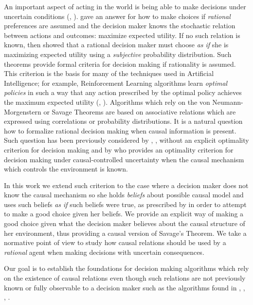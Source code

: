 \documentclass{article}
\theoremstyle{plain}
\begin{document}
An important aspect of acting in the world is being able to make decisions under uncertain conditions (\cite{danks2014unifying}, \cite{lake2017building}). \cite{von1944theory} gave an answer for how to make choices if \textit{rational} preferences are assumed and the decision maker knows the stochastic relation between actions and outcomes: maximize expected utility. If no such relation is known, then \cite{savage1954the} showed that a rational decision maker must choose \textit{as if} she is maximizing expected utility using a \textit{subjective} probability distribution. Such theorems provide formal criteria for decision making if rationality is assumed. This criterion is the basis for many of the techniques used in Artificial Intelligence; for example, Reinforcement Learning algorithms learn \textit{optimal policies} in such a way that any action prescribed by the optimal policy achieves the maximum expected utility (\cite{sutton1998reinforcement}, \cite{Puterman:1994:MDP:528623}). Algorithms which rely on the von Neumann-Morgenstern or Savage Theorems are based on associative relations which are expressed using correlations or probability distributions. It is a natural question how to formalize rational decision making when causal information is present. Such question has been previously considered by \cite{nozick1969newcomb}, \cite{lewis1981causal}, \cite{joyce1999foundations} without an explicit optimality criterion for decision making and by \cite{pearl2009causality} who provides an optimality criterion for decision making under causal-controlled uncertainty when the causal mechanism which controls the environment is known.

In this work we extend such criterion to the case where a decision maker does not know the causal mechanism so she holds \textit{beliefs} about possible causal model and uses such beliefs \textit{as if} such beliefs were true, as prescribed by \cite{joyce1999foundations} in order to attempt to make a good choice given her beliefs. We provide an explicit way of making a good choice given what the decision maker believes about the causal structure of her environment, thus providing a causal version of Savage's Theorem. We take a normative point of view to study how causal relations should be used by a \textit{rational} agent when making decisions with uncertain consequences.

Our goal is to establish the foundations for decision making algorithms which rely on the existence of causal relations even though such relations are not previously known or fully observable to a decision maker such as the algorithms found in \cite{bareinboim2015bandits}, \cite{lattimoreNIPS2016}, \cite{sen2017identifying}, \cite{gonzalez2018playing}.
\end{document}
